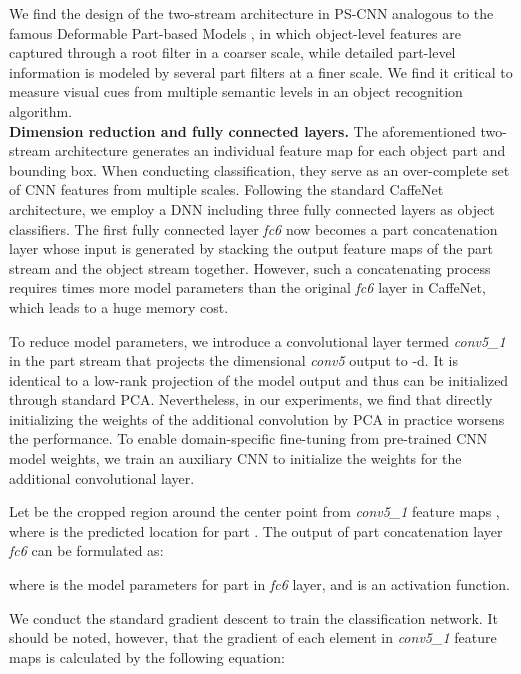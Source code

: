 \documentclass[10pt,twocolumn,letterpaper]{article}
\begin{document}
We find the design of the two-stream architecture in PS-CNN analogous to the famous Deformable Part-based Models \cite{felzenszwalb2010object}, in which object-level features are captured through a root filter in a coarser scale, while detailed part-level information is modeled by several part filters at a finer scale. We find it critical to measure visual cues from multiple semantic levels in an object recognition algorithm.\\


\noindent\textbf{Dimension reduction and fully connected layers.}
The aforementioned two-stream architecture generates an individual feature map for each object part and bounding box. When conducting classification, they serve as an over-complete set of CNN features from multiple scales. Following the standard CaffeNet architecture, we employ a DNN including three fully connected layers as object classifiers. The first fully connected layer \emph{fc6} now becomes a part concatenation layer whose input is generated by stacking the output feature maps of the part stream and the object stream together. However, such a concatenating process requires  times more model parameters than the original \textit{fc6} layer in CaffeNet, which leads to a huge memory cost.



To reduce model parameters, we introduce a  convolutional layer termed \textit{conv5\_1} in the part stream that projects the  dimensional \textit{conv5} output to -d. It is identical to a low-rank projection of the model output and thus can be initialized through standard PCA. Nevertheless, in our experiments, we find that directly initializing the weights of the additional convolution by PCA in practice worsens the performance. To enable domain-specific fine-tuning from pre-trained CNN model weights, we train an auxiliary CNN to initialize the weights for the additional convolutional layer.

Let  be the   cropped region around the center point  from \textit{conv5\_1} feature maps , where  is the predicted location for part . The output of part concatenation layer \emph{fc6} can be formulated as:

where  is the model parameters for part  in \emph{fc6} layer, and  is an activation function.




\iffalse
We conduct the standard gradient descent to train the classification network. It should be noted, however, that the gradient of each element  in \textit{conv5\_1} feature maps is calculated by the following equation:
\end{document}
